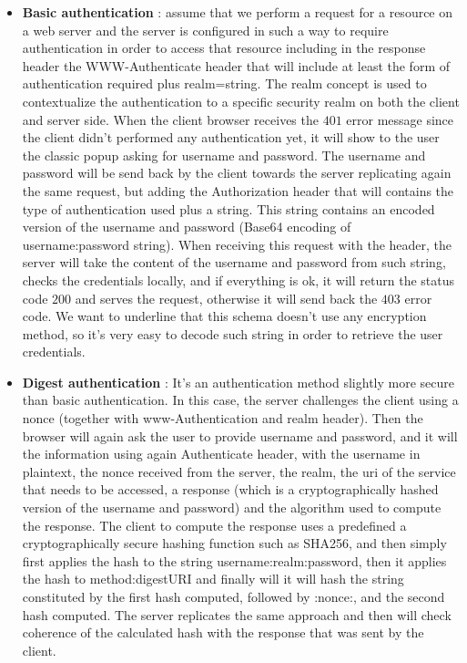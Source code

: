 \begin{itemize}
\item \textbf{Basic authentication} : assume that we perform a request for a resource on a web server and the server is configured in such a way to require authentication in order to access that resource including in the response header the WWW-Authenticate header that will include at least the form of authentication required plus realm=string. The realm concept is used to contextualize the authentication to a specific security realm on both the client and server side. When the client browser receives the $401$ error message since the client didn't performed any authentication yet, it will show to the user the classic popup asking for username and password. The username and password will be send back by the client towards the server replicating again the same request, but adding the Authorization header that will contains the type of authentication used plus a string. This string contains an encoded version of the username and password (Base64 encoding of username:password string). When receiving this request with the header, the server will take the content of the username and password from such string, checks the credentials locally, and if everything is ok, it will return the status code $200$ and serves the request, otherwise it will send back the $403$ error code. We want to underline that this schema doesn't use any encryption method, so it's very easy to decode such string in order to retrieve the user credentials. 
\item \textbf{Digest authentication} : It's an authentication method slightly more secure than basic authentication. In this case, the server challenges the client using a nonce (together with www-Authentication and realm header). Then the browser will again ask the user to provide username and password, and it will the information using again Authenticate header, with the username in plaintext, the nonce received from the server, the realm, the uri of the service that needs to be accessed, a response (which is a cryptographically hashed version of the username and password) and the algorithm used to compute the response. The client to compute the response uses a predefined a cryptographically secure hashing function such as SHA256, and then simply first applies the hash to the string username:realm:password, then it applies the hash to method:digestURI and finally will it will hash the string constituted by the first hash computed, followed by :nonce:, and the second hash computed. The server replicates the same approach and then will check coherence of the calculated hash with the response that was sent by the client.
\end{itemize}

